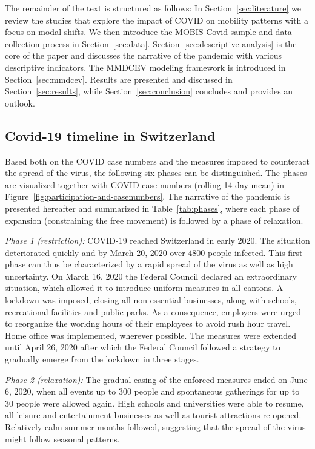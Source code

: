 \documentclass[%
    twoside, openright, titlepage, numbers=noenddot,%
    cleardoublepage=empty,%
    abstract=false,%
    BCOR=5.5mm, paper=a5, fontsize=10pt,%
]{mythesis}
\begin{document}
The remainder of the text is structured as follows: In Section~\ref{sec:literature} we review the studies that explore the impact of COVID on mobility patterns with a focus on modal shifts. We then introduce the MOBIS-Covid sample and data collection process in Section~\ref{sec:data}. Section~\ref{sec:descriptive-analysis} is the core of the paper and discusses the narrative of the pandemic with various descriptive indicators. The MMDCEV modeling framework is introduced in Section~\ref{sec:mmdcev}. Results are presented and discussed in Section~\ref{sec:results}, while Section~\ref{sec:conclusion} concludes and provides an outlook.

\subsection{Covid-19 timeline in Switzerland}
\label{sec:timeline}

Based both on the COVID case numbers and the measures imposed to counteract the spread of the virus, the following six phases can be distinguished. The phases are visualized together with COVID case numbers (rolling 14-day mean) in Figure~\ref{fig:participation-and-casenumbers}. The narrative of the pandemic is presented hereafter and summarized in Table~\ref{tab:phases}, where each phase of expansion (constraining the free movement) is followed by a phase of relaxation.

\emph{Phase 1 (restriction):} COVID-19 reached Switzerland in early 2020. The situation deteriorated quickly and by March 20, 2020 over $4800$ people infected. This first phase can thus be characterized by a rapid spread of the virus as well as high uncertainty. On March 16, 2020 the Federal Council declared an extraordinary situation, which allowed it to introduce uniform measures in all cantons. A lockdown was imposed, closing all non-essential businesses, along with schools, recreational facilities and public parks. As a consequence, employers were urged to reorganize the working hours of their employees to avoid rush hour travel. Home office was implemented, wherever possible. The measures were extended until April 26, 2020 after which the Federal Council followed a strategy to gradually emerge from the lockdown in three stages.

\emph{Phase 2 (relaxation):} The gradual easing of the enforced measures ended on June 6, 2020, when all events up to $300$ people and spontaneous gatherings for up to $30$ people were allowed again. High schools and universities were able to resume, all leisure and entertainment businesses as well as tourist attractions re-opened. Relatively calm summer months followed, suggesting that the spread of the virus might follow seasonal patterns.
\end{document}
